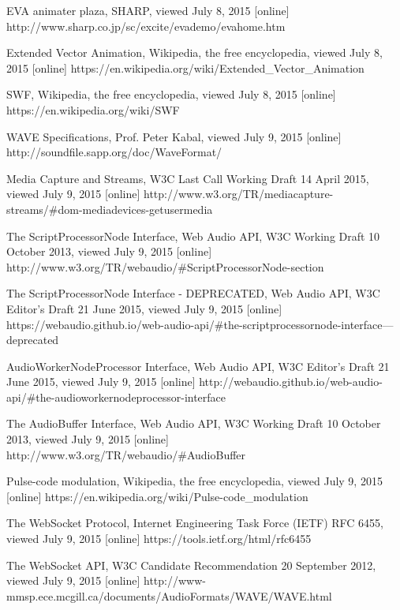 \begin{thebibliography}{99}
EVA animater plaza, SHARP, viewed July 8, 2015 [online]
http://www.sharp.co.jp/sc/excite/evademo/evahome.htm

Extended Vector Animation, Wikipedia, the free encyclopedia, viewed July 8, 2015 [online]
https://en.wikipedia.org/wiki/Extended\_Vector\_Animation

SWF, Wikipedia, the free encyclopedia, viewed July 8, 2015 [online]
https://en.wikipedia.org/wiki/SWF

WAVE Specifications, Prof. Peter Kabal, viewed July 9, 2015 [online]
http://soundfile.sapp.org/doc/WaveFormat/


Media Capture and Streams, W3C Last Call Working Draft 14 April 2015, viewed July 9, 2015 [online]
http://www.w3.org/TR/mediacapture-streams/\#dom-mediadevices-getusermedia

The ScriptProcessorNode Interface, Web Audio API, W3C Working Draft 10 October 2013, viewed July 9, 2015 [online]
http://www.w3.org/TR/webaudio/\#ScriptProcessorNode-section

The ScriptProcessorNode Interface - DEPRECATED, Web Audio API, W3C Editor's Draft 21 June 2015, viewed July 9, 2015 [online]
https://webaudio.github.io/web-audio-api/\#the-scriptprocessornode-interface---deprecated

AudioWorkerNodeProcessor Interface, Web Audio API, W3C Editor's Draft 21 June 2015, viewed July 9, 2015 [online]
http://webaudio.github.io/web-audio-api/\#the-audioworkernodeprocessor-interface	

The AudioBuffer Interface, Web Audio API, W3C Working Draft 10 October 2013, viewed July 9, 2015 [online]
http://www.w3.org/TR/webaudio/\#AudioBuffer

Pulse-code modulation, Wikipedia, the free encyclopedia, viewed July 9, 2015 [online]
https://en.wikipedia.org/wiki/Pulse-code\_modulation

The WebSocket Protocol, Internet Engineering Task Force (IETF) RFC 6455, viewed July 9, 2015 [online]
https://tools.ietf.org/html/rfc6455

The WebSocket API, W3C Candidate Recommendation 20 September 2012, viewed July 9, 2015 [online]
http://www-mmsp.ece.mcgill.ca/documents/AudioFormats/WAVE/WAVE.html


\end{thebibliography}
